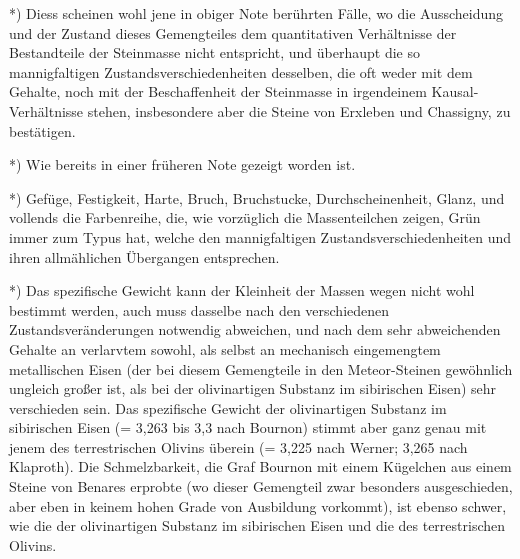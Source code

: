 \documentclass[a4paper, 11pt, oneside, german]{article}
\begin{document}
*) Diess scheinen wohl jene in obiger Note berührten Fälle, wo die Ausscheidung und der Zustand dieses Gemengteiles dem quantitativen Verhältnisse der Bestandteile der Steinmasse nicht entspricht, und überhaupt die so mannigfaltigen Zustandsverschiedenheiten desselben, die oft weder mit dem Gehalte, noch mit der Beschaffenheit der Steinmasse in irgendeinem Kausal-Verhältnisse stehen, insbesondere aber die Steine von Erxleben und Chassigny, zu bestätigen.

*) Wie bereits in einer früheren Note gezeigt worden ist.

*) Gefüge, Festigkeit, Harte, Bruch, Bruchstucke, Durchscheinenheit, Glanz, und vollends die Farbenreihe, die, wie vorzüglich die Massenteilchen zeigen, Grün immer zum Typus hat, welche den mannigfaltigen Zustandsverschiedenheiten und ihren allmählichen Übergangen entsprechen.

*) Das spezifische Gewicht kann der Kleinheit der Massen wegen nicht wohl bestimmt werden, auch muss dasselbe nach den verschiedenen Zustandsveränderungen notwendig abweichen, und nach dem sehr abweichenden Gehalte an verlarvtem sowohl, als selbst an mechanisch eingemengtem metallischen Eisen (der bei diesem Gemengteile in den Meteor-Steinen gewöhnlich ungleich großer ist, als bei der olivinartigen Substanz im sibirischen Eisen) sehr verschieden sein. Das spezifische Gewicht der olivinartigen Substanz im sibirischen Eisen (= 3,263 bis 3,3 nach Bournon) stimmt aber ganz genau mit jenem des terrestrischen Olivins überein (= 3,225 nach Werner; 3,265 nach Klaproth). Die Schmelzbarkeit, die Graf Bournon mit einem Kügelchen aus einem Steine von Benares erprobte (wo dieser Gemengteil zwar besonders ausgeschieden, aber eben in keinem hohen Grade von Ausbildung vorkommt), ist ebenso schwer, wie die der olivinartigen Substanz im sibirischen Eisen und die des terrestrischen Olivins.
\end{document}
